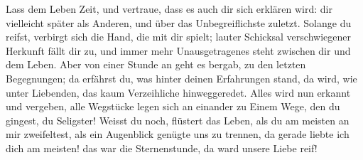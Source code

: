 Lass dem Leben Zeit, und vertraue, dass es auch dir sich erklären wird: dir vielleicht später als Anderen, und über das Unbegreiflichste zuletzt. Solange du reifst, verbirgt sich die Hand, die mit dir spielt; lauter Schicksal verschwiegener Herkunft fällt dir zu, und immer mehr Unausgetragenes steht zwischen dir und dem Leben. Aber von einer Stunde an geht es bergab, zu den letzten Begegnungen; da erfährst du, was hinter deinen Erfahrungen stand, da wird, wie unter Liebenden, das kaum Verzeihliche hinweggeredet. Alles wird nun erkannt und vergeben, alle Wegstücke legen sich an einander zu Einem Wege, den du gingest, du Seligster! Weisst du noch, flüstert das Leben, als du am meisten an mir zweifeltest, als ein Augenblick genügte uns zu trennen, da gerade liebte ich dich am meisten! das war die Sternenstunde, da ward unsere Liebe reif!
\par

